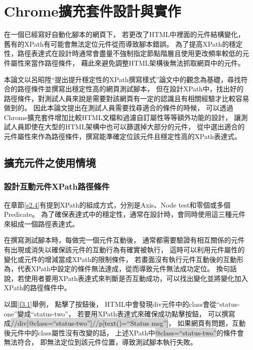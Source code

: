 \chapter{Chrome擴充套件設計與實作}
\indent

在一個已經寫好自動化腳本的網頁下，
若更改了HTML中裡面的元件結構變化，
舊有的XPath有可能會無法定位元件從而導致腳本錯誤。
為了提高XPath的穩定性，路徑表達式在設計時通常會盡量不強制指定節點階層且使用更改頻率較低的元件屬性來當作路徑條件，
藉此來避免調整HTML架構後無法抓取網頁中的元件。

本論文以呂昭陞``提出提升穩定性的XPath撰寫樣式''論文\cite{LIU-Thesis}中的觀念為基礎，尋找符合的路徑條件並撰寫出穩定性高的網頁測試腳本，
但在設計XPath中，找出好的路徑條件，對測試人員來說是需要對該網頁有一定的認識且有相關經驗才比較容易做到的。
因此本論文提出在測試人員需要找尋適合的條件的時候，
可以透過Chrome擴充套件增加比較HTML文檔和過濾自訂屬性等等額外功能的設計，
讓測試人員即使在大型的HTML架構中也可以篩選掉大部分的元件，
從中選出適合的元件屬性來作為路徑條件，撰寫能準確定位該元件且穩定性高的XPath表達式。

\section{擴充元件之使用情境}\label{s3.1}
\subsection{設計互動元件XPath路徑條件}\label{s3.1.1}
在章節\ref{s2.4}有提到XPath的組成方式，分別是Axis、Node test和零個或多個Predicate。
為了確保表達式中的穩定性，通常在設計時，會同時使用這三種元件來組成一個路徑表達式。

在撰寫測試腳本時，每做完一個元件互動後，
通常都需要驗證有相互關係的元件有出現或消失以確保該元件的互動行為有確實被執行，
這時可以利用元件屬性的變化或元件的增減當成XPath的限制條件，
若畫面沒有執行元件互動後的互動形為，代表XPath中設定的條件無法達成，從而導致元件無法成功定位。
換句話說，若使用者要用XPath表達式來判斷是否互動成功，可以找出變化並將變化加入XPath的路徑條件中。

以圖\ref{f3.1}舉例，
點擊了按鈕後，
HTML中會發現div元件中的class會從``status-one''變成``status-two''，
若要用XPath表達式來確保成功點擊按鈕，
可以撰寫成\colorbox{lightgray}{//div[@class=``status-two'']//p[text()=``Status msg'']}，
如果網頁有問題，互動後元件中的class屬性沒有改變的話，
上述XPath中\colorbox{lightgray}{@class=``status-two''}的條件會無法符合，
即無法定位到該元件位置，導致測試腳本執行失敗。

